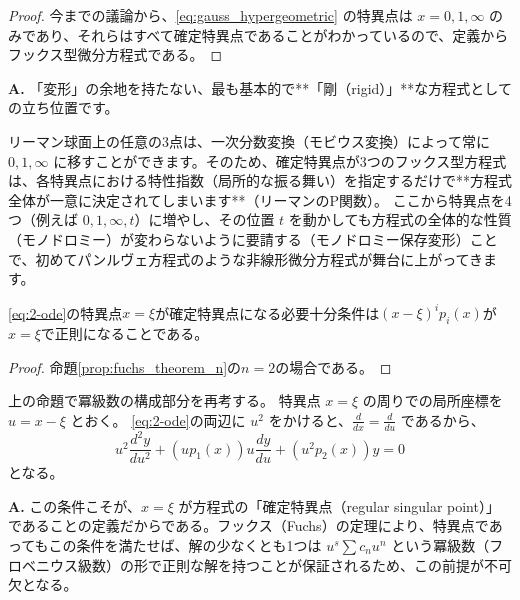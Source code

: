 \begin{proof}
    今までの議論から、\eqref{eq:gauss_hypergeometric} の特異点は $x=0,1,\infty$ のみであり、それらはすべて確定特異点であることがわかっているので、定義からフックス型微分方程式である。
\end{proof}

\begin{Q}
\textbf{A.} 「変形」の余地を持たない、最も基本的で**「剛（rigid）」**な方程式としての立ち位置です。

リーマン球面上の任意の3点は、一次分数変換（モビウス変換）によって常に $0, 1, \infty$ に移すことができます。そのため、確定特異点が3つのフックス型方程式は、各特異点における特性指数（局所的な振る舞い）を指定するだけで**方程式全体が一意に決定されてしまいます**（リーマンのP関数）。
ここから特異点を4つ（例えば $0, 1, \infty, t$）に増やし、その位置 $t$ を動かしても方程式の全体的な性質（モノドロミー）が変わらないように要請する（モノドロミー保存変形）ことで、初めてパンルヴェ方程式のような非線形微分方程式が舞台に上がってきます。
\end{Q}
\begin{proposition}
    \eqref{eq:2-ode}の特異点$x=\xi$が確定特異点になる必要十分条件は$(x-\xi)^{i}p_{i}(x)$が$x=\xi$で正則になることである。
\end{proposition}

\begin{proof}
    命題\ref{prop:fuchs_theorem_n}の$n=2$の場合である。
\end{proof}
上の命題で冪級数の構成部分を再考する。
特異点 $x=\xi$ の周りでの局所座標を $u = x - \xi$ とおく。
\eqref{eq:2-ode}の両辺に $u^{2}$ をかけると、$\frac{d}{dx} = \frac{d}{du}$ であるから、
\[
u^{2}\frac{d^{2}y}{du^{2}} + (u p_{1}(x)) u\frac{dy}{du} + (u^{2} p_{2}(x)) y = 0
\]
となる。

\begin{Q}
\textbf{A.} この条件こそが、$x=\xi$ が方程式の「確定特異点（regular singular point）」であることの定義だからである。フックス（Fuchs）の定理により、特異点であってもこの条件を満たせば、解の少なくとも1つは $u^s \sum c_n u^n$ という冪級数（フロベニウス級数）の形で正則な解を持つことが保証されるため、この前提が不可欠となる。
\end{Q}

